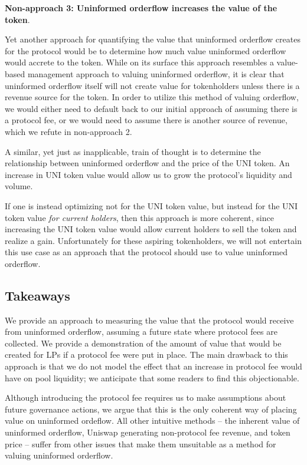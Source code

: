     \textbf{Non-approach 3: Uninformed orderflow increases the value of the token}.

    Yet another approach for quantifying the value that uninformed orderflow creates for the protocol would be to determine how much value uninformed orderflow would accrete to the token. While on its surface this approach resembles a value-based management approach to valuing uninformed orderflow, it is clear that uninformed orderflow itself will not create value for tokenholders unless there is a revenue source for the token. In order to utilize this method of valuing orderflow, we would either need to default back to our initial approach of assuming there is a protocol fee, or we would need to assume there is another source of revenue, which we refute in non-approach 2.

    A similar, yet just as inapplicable, train of thought is to determine the relationship between uninformed orderflow and the price of the UNI token. An increase in UNI token value would allow us to grow the protocol's liquidity and volume. %

    If one is instead optimizing not for the UNI token value, but instead for the UNI token value \textit{for current holders}, then this approach is more coherent, since increasing the UNI token value would allow current holders to sell the token and realize a gain. Unfortunately for these aspiring tokenholders, we will not entertain this use case as an approach that the protocol should use to value uninformed orderflow.

\subsection{Takeaways}
    We provide an approach to measuring the value that the protocol would receive from uninformed orderflow, assuming a future state where protocol fees are collected. We provide a demonstration of the amount of value that would be created for LPs if a protocol fee were put in place. The main drawback to this approach is that we do not model the effect that an increase in protocol fee would have on pool liquidity; we anticipate that some readers to find this objectionable.

    Although introducing the protocol fee requires us to make assumptions about future governance actions, we argue that this is the only coherent way of placing value on uninformed ordeflow. All other intuitive methods -- the inherent value of uninformed orderflow, Uniswap generating non-protocol fee revenue, and token price -- suffer from other issues that make them unsuitable as a method for valuing uninformed orderflow.